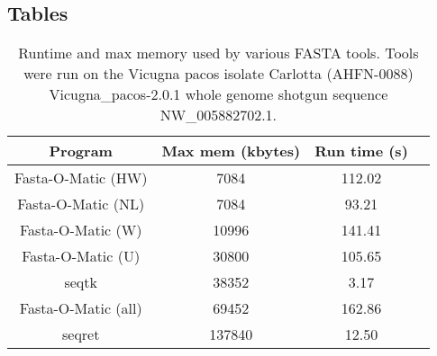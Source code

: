 \documentclass{bmcart}
\begin{document}
\begin{backmatter}


\section*{Tables}

\begin{table}[h!]
\caption{Runtime and max memory used by various FASTA tools. Tools were run on the Vicugna pacos isolate Carlotta (AHFN-0088) Vicugna\_pacos-2.0.1 whole genome shotgun sequence NW\_005882702.1.} 
    \begin{tabular}{ cccc }
        Program & Max mem (kbytes) & Run time (s) \\ \hline
        Fasta-O-Matic (HW) & 7084 & 112.02 \\ 
        Fasta-O-Matic (NL) & 7084 & 93.21 \\ 
        Fasta-O-Matic (W) & 10996 & 141.41 \\ 
        Fasta-O-Matic (U) & 30800 & 105.65 \\ 
        seqtk & 38352 & 3.17 \\ 
        Fasta-O-Matic (all) & 69452 & 162.86 \\ 
        seqret & 137840 & 12.50 \\
    \end{tabular} 
\end{table}









\end{backmatter}
\end{document}
